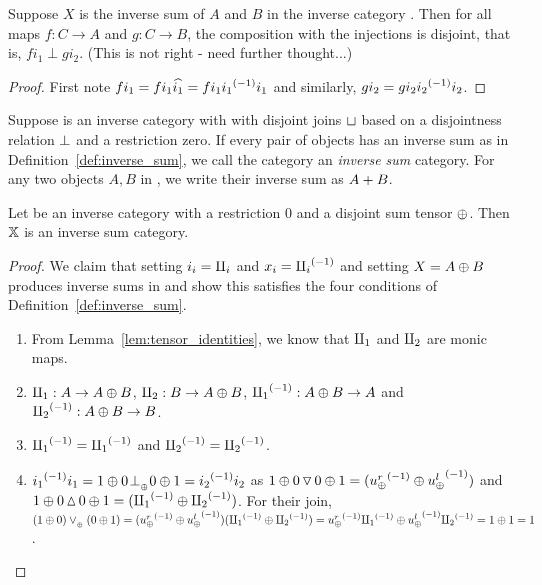 \begin{lemma}\label{lem:all_maps_to_inverse_sum_are_disjoint}
  Suppose $X$ is the inverse sum of $A$ and $B$ in the inverse category \X. Then for all maps
  $f:C \to A$ and $g: C \to B$, the composition with the injections is disjoint, that is,
  $f i_1 \perp g i_2$. (This is not right - need further thought...)
\end{lemma}
\begin{proof}
  First note $f i_1 = f i_1 \widehat{i_1} = f i_1 {i_1}^{(-1)} i_1$ and similarly, $g i_2 = g i_2
  {i_2}^{(-1)} i_2$.
\end{proof}

\begin{definition}\label{def:inverse_sum_category}
  Suppose \X is an inverse category with with disjoint joins $\sqcup$ based on a disjointness
  relation $\perp$ and a restriction zero. If every pair of objects has an inverse sum as in
  Definition~\ref{def:inverse_sum}, we call the category an \emph{inverse sum} category. For any
  two objects $A,B$ in \X, we write their inverse sum as ${{A}+{B}}$.
\end{definition}

\begin{lemma}\label{lem:tensor_disjoint_sum_cats_are_inverse_sum_categories}
  Let \X be an inverse category with a restriction 0 and a disjoint sum tensor $\oplus$. Then $\mathbb{X}$ is
  an inverse sum category.
\end{lemma}
\begin{proof}
  We claim that setting $i_i = \amalg_{i}$ and $x_i = {\amalg_{i}}^{(-1)}$ and setting $X = A\oplus B$ produces inverse
  sums in \X and show this satisfies the four conditions of Definition~\ref{def:inverse_sum}.
  \begin{enumerate}[{(}i{)}]
    \item From Lemma~\ref{lem:tensor_identities}, we know that $\amalg_{1}$ and $\amalg_{2}$ are monic maps.
    \item $\amalg_{1} : A \to A\oplus B$, $\amalg_{2}: B \to A\oplus B$, ${\amalg_{1}}^{(-1)}: A\oplus B \to A$ and ${\amalg_{2}}^{(-1)}: A\oplus B \to B$.
    \item ${\amalg_{1}}^{(-1)} = {\amalg_{1}}^{(-1)}$ and ${\amalg_{2}}^{(-1)} = {\amalg_{2}}^{(-1)}$.
    \item ${i_1}^{(-1)}i_1 = 1\oplus 0 {}_{{}_{}}{\perp_{{}_{\oplus}}} 0\oplus1 = {i_2}^{(-1)}i_2$ as
      $1\oplus0 \operatorname{\triangledown} 0\oplus1 = ({u_{\oplus}^r}^{(-1)}\oplus{\ensuremath{u_{\oplus}^l}}^{(-1)})$ and
      $1\oplus0 \operatorname{\vartriangle} 0\oplus1 = ({\amalg_{1}}^{(-1)}\oplus{\amalg_{2}}^{(-1)})$. For their join,
      $(1\oplus0)\vee_{{_{\oplus}}} (0\oplus1) = ({u_{\oplus}^r}^{(-1)}\oplus{\ensuremath{u_{\oplus}^l}}^{(-1)})({\amalg_{1}}^{(-1)}\oplus{\amalg_{2}}^{(-1)}) =
      {u_{\oplus}^r}^{(-1)}{\amalg_{1}}^{(-1)} \oplus {\ensuremath{u_{\oplus}^l}}^{(-1)}{\amalg_{2}}^{(-1)} = 1\oplus1 = 1$.
  \end{enumerate}
\end{proof}

